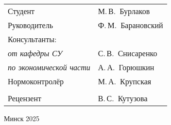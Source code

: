 \begin{titlepage}
\begin{center}
    \begin{tabular}{ p{}p{} }
      Студент & М.\,В.~Бурлаков \\
      Руководитель & Ф.\,М.~Барановский \\
      Консультанты: &\\
      \hspace*{3ex}\emph{от кафедры СУ} & С.\,В.~Снисаренко \\
      \hspace*{3ex}\emph{по экономической части} & А.\,А.~Горюшкин \\
      Нормоконтролёр & М.\,А.~Крупская\\
      & \\
      Рецензент & В.\,С.~Кутузова \\
    \end{tabular}
    
    \vfill
    {\normalsize Минск 2025}
  \end{center}
\end{titlepage}